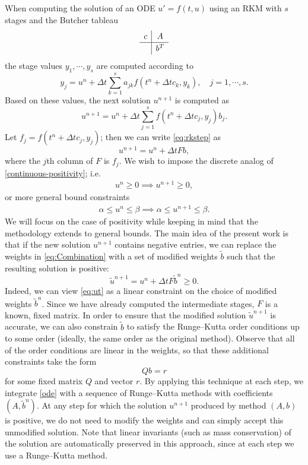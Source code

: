 \documentclass[a4paper]{article}
\numberwithin{equation}{section}
\theoremstyle{plain}
\theoremstyle{definition}
\numberwithin{theorem}{section}
\newcommand{\dt}{{\Delta t}}
\newcommand{\1}{\mathbbm{1}}
\newcommand{\ut}{\tilde{u}}
\newcommand{\bt}{\tilde{b}}
\begin{document}
When computing the solution of an ODE $u ' = f(t,u) $ using an RKM with $s$ stages and the Butcher tableau
\begin{align}
\renewcommand{\arraystretch}{1.2}
\begin{array}{c|c}
c &  A \\
\hline
 & b^T\\
\end{array}
\end{align}
the stage values $y_1,\cdots,y_s$ are computed according to
\begin{equation}\label{eq:stagevalues}
y_j =  u^n + \dt \sum_{k = 1}^{s} a_{jk} f(t^n + \dt c_k,y_k),  \quad j = 1,\cdots,s.
\end{equation}
Based on these values, the next solution $u^{n+1}$ is computed as
\begin{equation} \label{eq:rkstep}
u^{n+1} = u^n + \dt \sum_{j  = 1}^s f(t^n + \dt c_j,y_j) b_j .
\end{equation}
Let $f_j = f(t^n + \dt c_j,y_j)$; then we can write \eqref{eq:rkstep} as
\begin{equation}\label{eq:Combination}
u^{n+1} = u^n + \dt F b,
\end{equation}
where the $j$th column of $F$ is $f_j$.
We wish to impose the discrete analog of \eqref{continuous-positivity}; i.e.
\begin{align} \label{positivity}
    u^n\ge 0 \implies u^{n+1} \ge 0,
\end{align}
or more general bound constraints
\begin{align}
    \alpha \le u^n\le \beta \implies \alpha \le u^{n+1} \le \beta.
\end{align}
We will focus on the case of positivity while keeping in mind that
the methodology extends to general bounds.
The main idea of the present work is that if the new solution $u^{n+1}$ contains
negative entries, we can replace the weights in \eqref{eq:Combination} with
a set of modified weights $\bt$ such that the resulting solution is positive:
\begin{equation}\label{eq:ut}
\ut^{n+1} = u^n + \dt F \bt^n \ge 0.
\end{equation}
Indeed, we can view \eqref{eq:ut} as a linear constraint on the choice of
modified weights $\bt^n$.  Since we have already computed the intermediate stages,
$F$ is a known, fixed matrix.  In order to ensure that the modified solution $\ut^{n+1}$
is accurate, we can also constrain $\bt$ to satisfy the Runge--Kutta order conditions
up to some order (ideally, the same order as the original method).  Observe that
all of the order conditions are linear in the weights, so that these additional constraints
take the form
$$
Qb = r
$$
for some fixed matrix $Q$ and vector $r$.
By applying this technique at each step, we integrate \eqref{ode} with a
sequence of Runge--Kutta methods with coefficients $(A,\bt^n)$.  At any step
for which the solution $u^{n+1}$ produced by method $(A,b)$ is positive, we do not
need to modify the weights and can simply accept this unmodified solution.
Note that linear invariants (such as mass conservation) of the solution are
automatically preserved in this approach, since at each step we use a Runge--Kutta
method.
\end{document}
